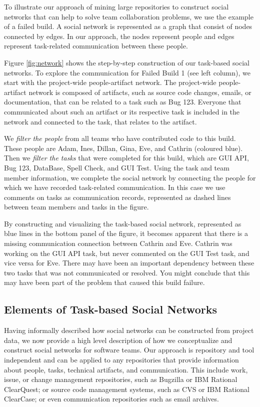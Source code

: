 To illustrate our approach of mining large repositories to construct social
networks that can help to solve team collaboration problems, we use the example
of a failed build. A social network is represented as a graph that consist of
nodes connected by edges. In our approach, the nodes represent people and edges
represent task-related communication between these people.

Figure \ref{fig:network} shows the step-by-step construction of our task-based
social networks. To explore the communication for Failed Build 1 (see left
column), we start with the project-wide people-artifact network. 
%
The project-wide people-artifact network is composed of artifacts, such as 
source code changes, emails, or documentation, that can be related to a task such as Bug 123.
Everyone that communicated about such an artifact or its respective task is included in the network
and connected to the task, that relates to the artifact.
%

We \emph{filter the people} from all teams who have contributed code to this
build. These people are Adam, Ines, Dillan, Gina, Eve, and Cathrin (coloured
blue). Then we \emph{filter the tasks} that were completed for this build, which
are GUI API, Bug 123, DataBase, Spell Check, and GUI Test. Using the task and
team member information, we complete the social network by connecting the people
for which we have recorded task-related communication. In this case we use
comments on tasks as communication records, represented as dashed lines between
team members and tasks in the figure.

By constructing and visualizing the task-based social network, represented as
blue lines in the bottom panel of the figure, it becomes apparent that there is a
missing communication connection between Cathrin and Eve. Cathrin was working on
the GUI API task, but never commented on the GUI Test task, and vice versa for
Eve. There may have been an important dependency between these two tasks that was
not communicated or resolved. You might conclude that this may have been part of
the problem that caused this build failure.

\subsection{Elements of Task-based Social Networks} 
Having informally described how social networks can be constructed from project
data, we now provide a high level description of how we conceptualize and
construct social networks for software teams. Our approach is repository and tool
independent and can be applied to any repositories that provide information about
people, tasks, technical artifacts, and communication. This include work, issue,
or change management repositories, such as Bugzilla or IBM Rational
ClearQuest\texttrademark; or source code management systems, such as CVS or IBM
Rational ClearCase\texttrademark; or even communication repositories such as
email archives.


